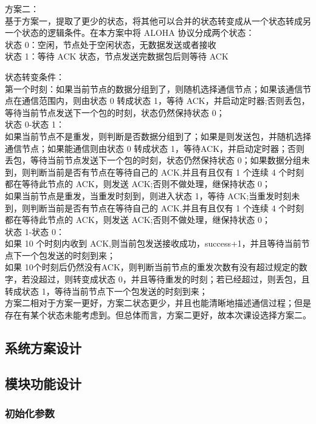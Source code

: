 \documentclass{article}
\begin{document}
	方案二：\\
	基于方案一，提取了更少的状态，将其他可以合并的状态转变成从一个状态转成另一个状态的逻辑条件。在本方案中将 ALOHA 协议分成两个状态：\\
	状态 0：空闲，节点处于空闲状态，无数据发送或者接收\\
	状态 1：等待 ACK 状态，节点发送完数据包后则等待 ACK\\ \par

	
	状态转变条件：\\
	第一个时刻：如果当前节点的数据分组到了，则随机选择通信节点；如果该通信节点在通信范围内，则由状态 0 转成状态 1，等待 ACK，并启动定时器;否则丢包，等待当前节点发送下一个包的时刻，状态仍然保持状态 0；\\
	状态 0-状态 1：\\
	如果当前节点不是重发，则判断是否数据分组到了；如果是则发送包，并随机选择通信节点；如果能通信则由状态 0 转成状态 1，等待ACK，并启动定时器；否则丢包，等待当前节点发送下一个包的时刻，状态仍然保持状态 0；如果数据分组未到，则判断当前是否有节点在等待自己的 ACK,并且有且仅有 1 个连续 4 个时刻都在等待此节点的 ACK，则发送 ACK;否则不做处理，继保持状态 0；\\
	如果当前节点是重发，当重发时刻到，则进入状态 1，等待 ACK;当重发时刻未到，则判断当前是否有节点在等待自己的 ACK,并且有且仅有 1 个连续 4 个时刻都在等待此节点的 ACK，则发送 ACK;否则不做处理，继保持状态 0；\\
	状态 1-状态 0：\\
	如果 10 个时刻内收到 ACK,则当前包发送接收成功，success+1，并且等待当前节点下一个包发送的时刻到来；\\
	如果 10个时刻后仍然没有ACK，则判断当前节点的重发次数有没有超过规定的数字，若没超过，则转变成状态 0，并且等待重发的时刻；若已经超过，则丢包，且转成状态 1，等待当前节点下一个包发送的时刻到来；\\
	
	方案二相对于方案一更好，方案二状态更少，并且也能清晰地描述通信过程；但是存在有某个状态未能考虑到。但总体而言，方案二更好，故本次课设选择方案二。
	
	

	
	\subsection{系统方案设计}
	\subsection{模块功能设计}
	\subsubsection{初始化参数}
\end{document}
